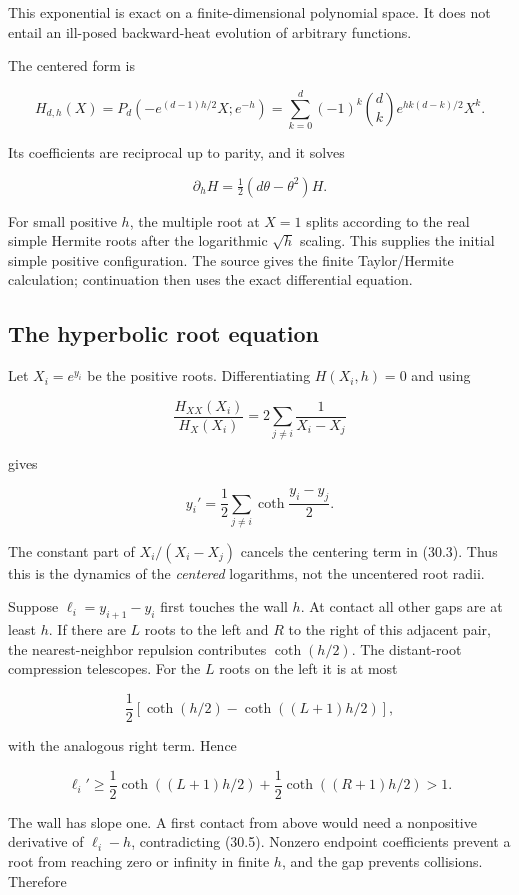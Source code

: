 \documentclass[
  10pt,
  a4paper,
  10pt,
  oneside,
  openany]{book}
\begin{document}
This exponential is exact on a finite-dimensional polynomial space. It
does not entail an ill-posed backward-heat evolution of arbitrary
functions.

The centered form is

\[
 H_{d,h}(X)=P_d(-e^{(d-1)h/2}X;e^{-h})
 =\sum_{k=0}^d(-1)^k\binom dk e^{hk(d-k)/2}X^k.
 \tag{30.2}\label{eq:30.2}
\]

Its coefficients are reciprocal up to parity, and it solves

\[
 \partial_hH=\tfrac12(d\theta-\theta^2)H.
 \tag{30.3}\label{eq:30.3}
\]

For small positive \(h\), the multiple root at \(X=1\) splits according
to the real simple Hermite roots after the logarithmic \(\sqrt h\)
scaling. This supplies the initial simple positive configuration. The
source gives the finite Taylor/Hermite calculation; continuation then
uses the exact differential equation.

\subsection{The hyperbolic root
equation}\label{the-hyperbolic-root-equation}

Let \(X_i=e^{y_i}\) be the positive roots. Differentiating
\(H(X_i,h)=0\) and using

\[
 \frac{H_{XX}(X_i)}{H_X(X_i)}
 =2\sum_{j\ne i}\frac1{X_i-X_j}
\]

gives

\[
 \boxed{y_i'
 =\frac12\sum_{j\ne i}\coth\frac{y_i-y_j}{2}.}
 \tag{30.4}\label{eq:30.4}
\]

The constant part of \(X_i/(X_i-X_j)\) cancels the centering term in
(30.3). Thus this is the dynamics of the \emph{centered} logarithms, not
the uncentered root radii.

Suppose \(\ell_i=y_{i+1}-y_i\) first touches the wall \(h\). At contact
all other gaps are at least \(h\). If there are \(L\) roots to the left
and \(R\) to the right of this adjacent pair, the nearest-neighbor
repulsion contributes \(\coth(h/2)\). The distant-root compression
telescopes. For the \(L\) roots on the left it is at most

\[
 \frac12\left[\coth(h/2)-\coth((L+1)h/2)\right],
\]

with the analogous right term. Hence

\[
 \ell_i'\ge\frac12\coth((L+1)h/2)
 +\frac12\coth((R+1)h/2)>1.
 \tag{30.5}\label{eq:30.5}
\]

The wall has slope one. A first contact from above would need a
nonpositive derivative of \(\ell_i-h\), contradicting (30.5). Nonzero
endpoint coefficients prevent a root from reaching zero or infinity in
finite \(h\), and the gap prevents collisions. Therefore
\end{document}
